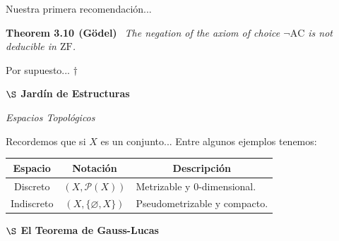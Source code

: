 \documentclass[8pt]{extarticle}
\begin{document}
{\small {}\selectfont Nuestra primera recomendación...}
\vspace{0.2cm}

\noindent
{\small {}\selectfont \textbf{Theorem 3.10$~~$(Gödel)} $~~$\textit{The negation of the axiom of choice $\neg \mathrm{AC}$ is not deducible in $\mathrm{ZF}$.}} 
\vspace{0.2cm}

{\small {}\selectfont Por supuesto... $\dagger$}



\newpage


\begin{center}
    {\large \textbf{ $\S$ Jardín de Estructuras}} {$~$\small\FourClowerSolid }
\end{center}
\vspace{0.14cm}

\begin{center}
    {\decothreeleft\large\textit{ Espacios Topológicos }\decothreeleft}
\end{center}

\vspace{0.15cm}

{\fontsize{7}{5} \selectfont  Recordemos que si $X$ es un conjunto... 
Entre algunos ejemplos tenemos:}


\begin{center}
\footnotesize {}\selectfont 
\setlength{\tabcolsep}{4pt}
\begin{tabular}{@{} c c m{2.55cm} @{}}
\toprule
\textbf{Espacio} & \textbf{Notación} & \multicolumn{1}{c}{\textbf{Descripción}} \\
\midrule
Discreto & $(X, \mathscr{P}(X))$ & \raggedright\arraybackslash\scriptsize Metrizable y $0$-dimensional. \\[4pt]
Indiscreto & $(X, \{\varnothing, X\})$ & \raggedright\arraybackslash\scriptsize Pseudometrizable y compacto. \\
\bottomrule
\end{tabular}
\end{center}


\newpage


\begin{center}
    {\large \textbf{ $\S$ El Teorema de Gauss-Lucas}} {$~$\small\faPenNib}
\end{center}
\end{document}
